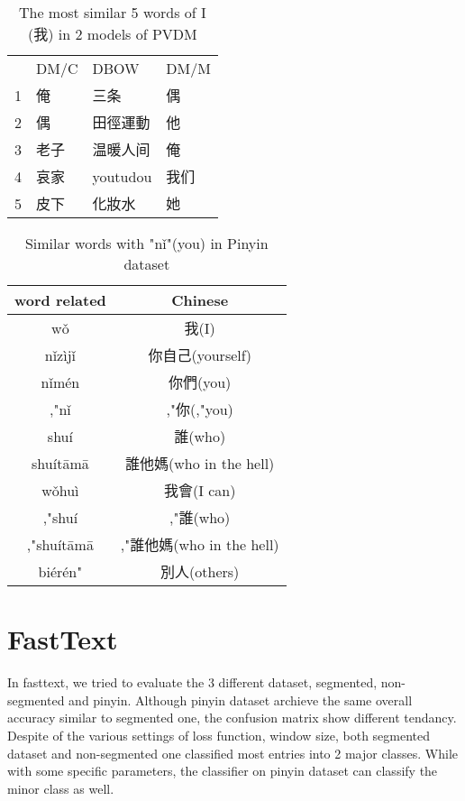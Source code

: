 \begin{table}[]
\centering
\caption{The most similar 5 words of I (我) in 2 models of PVDM}
\label{table:doc2vec}
\begin{tabular}{llll}
      & DM/C & DBOW & DM/M \\
1 & 俺 &  三条  & 偶\\
2 & 偶  & 田徑運動 & 他\\
3 & 老子  & 温暖人间 & 俺\\
4 & 哀家  & youtudou & 我们\\
5 & 皮下  & 化妝水 & 她
\end{tabular}
\end{table}

\begin{table}[]
\centering
\caption{Similar words with "nǐ"(you) in Pinyin dataset}
\label{table:py_similar}
\begin{tabular}{|c|c|}
\hline
 word related  & Chinese  \\
\hline
wǒ         &   我(I)  \\
nǐzìjǐ     &   你自己(yourself) \\   
nǐmén      &   你們(you)   \\
,"nǐ       &   ,"你(,"you)  \\ 
shuí       &   誰(who)   \\
shuítāmā   &   誰他媽(who in the hell)\\   
wǒhuì      &   我會(I can)   \\
,"shuí     &   ,"誰(who)   \\
,"shuítāmā &   ,"誰他媽(who in the hell)\\   
biérén"    &   別人(others)\\
\hline
\end{tabular}
\end{table}


\section{FastText}

In fasttext, we tried to evaluate the 3 different dataset, segmented, non-segmented and pinyin. 
Although pinyin dataset archieve the same overall accuracy similar to segmented one, the confusion matrix show different tendancy.
Despite of the various settings of loss function, window size, both segmented dataset and non-segmented one classified most entries into 2 major classes.
While with some specific parameters, the classifier on pinyin dataset can classify the minor class as well. 

